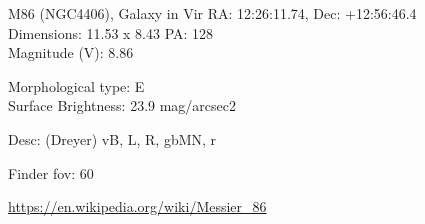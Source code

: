 \begin{block}{M86 (NGC4406), Galaxy in Vir}
    RA: 12:26:11.74, Dec: +12:56:46.4 \\ 
    Dimensions: 11.53 x 8.43 PA: 128 \\ 
    Magnitude (V): 8.86

    Morphological type: E \\ 
    Surface Brightness: 23.9 mag/arcsec2 

    Desc: (Dreyer) vB, L, R, gbMN, r 

    Finder fov: 60 

    \url{https://en.wikipedia.org/wiki/Messier_86} 
\end{block}